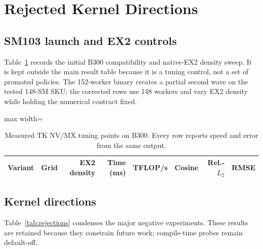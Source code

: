 \section{Rejected Kernel Directions}
\label{app:rejections}

\subsection{SM103 launch and EX2 controls}
\label{app:sm103-tuning}

Table~\ref{tab:b300-tuning} records the initial B300 compatibility and
native-EX2 density sweep. It is kept outside the main result table because it
is a tuning control, not a set of promoted policies. The 152-worker binary
creates a partial second wave on the tested 148-SM SKU; the corrected rows use
148 workers and vary EX2 density while holding the numerical contract fixed.

\begin{table}[htbp]
\centering
\caption{Measured TK NV/MX tuning points on B300. Every row reports speed and
error from the same output.}
\label{tab:b300-tuning}
\scriptsize
\begin{adjustbox}{max width=\textwidth}
\begin{tabular}{lrrrrrrr}
\toprule
Variant & Grid & EX2 density & Time (ms) & TFLOP/s & Cosine & Rel.-$L_2$ & RMSE \\
\midrule
%
\end{tabular}
\end{adjustbox}
\end{table}

\subsection{Kernel directions}

Table~\ref{tab:rejections} condenses the major negative experiments. These
results are retained because they constrain future work; compile-time probes
remain default-off.

